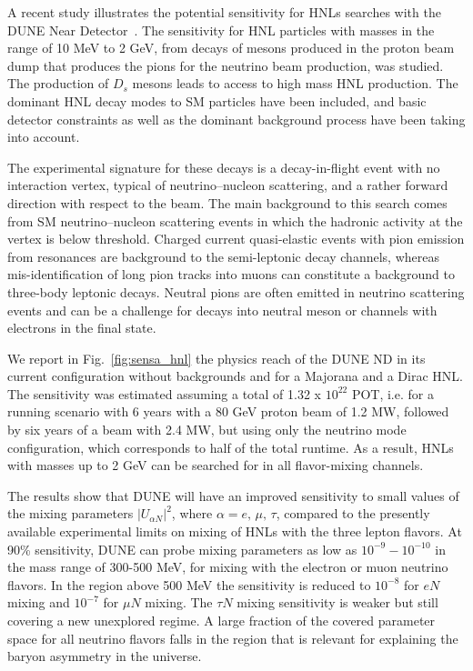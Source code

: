A recent study illustrates the potential sensitivity for  HNLs searches with the DUNE Near Detector~\cite{Ballett:2019bgd}. The sensitivity for HNL particles with masses in the range of 10 MeV to 2 GeV, from decays of mesons produced
in the proton beam dump that produces the pions for the neutrino beam production, was studied. The production
of $D_s$ mesons leads to access to high mass HNL production. The dominant HNL decay modes to SM particles
have been included, and basic detector constraints as well as the dominant background process have 
been taking into account. 

The experimental signature for these decays is a decay-in-flight event with no interaction vertex, typical of
neutrino--nucleon scattering, and a rather forward direction with respect to the beam.
The main background to this search comes from SM neutrino--nucleon scattering events in which the hadronic activity
at the vertex is below threshold.
Charged current quasi-elastic events with pion emission from resonances are background to the semi-leptonic decay channels,
whereas mis-identification of long pion tracks into muons can constitute a background to three-body leptonic decays.
Neutral pions are often emitted in neutrino scattering events and can be a challenge for decays into %
neutral meson or channels with electrons in the final state.

We report in Fig.~\ref{fig:sensa_hnl} the physics reach of the DUNE ND in its current configuration %
without backgrounds and for a Majorana and a Dirac HNL.
The sensitivity was estimated assuming a total of 1.32 x $10^{22}$ POT, i.e. for a running scenario with 6 years with a 80 GeV proton beam of 1.2 MW, followed by six years of a beam with 2.4 MW, but using only the neutrino mode configuration, which corresponds to half of the total
runtime.
As a result, HNLs with masses up to 2 GeV can be searched for in all flavor-mixing channels.



The results show that DUNE will have an improved sensitivity to small values of the
mixing parameters $|U_{\alpha N}|^2$, where $\alpha=e,\,\mu,\,\tau$, compared to the presently available experimental
limits on mixing of HNLs with the three lepton flavors. At 90\%  sensitivity, DUNE can probe mixing parameters as low as 
$10^{-9}-10^{-10}$ in the mass range of 300-500 MeV, for  mixing with the electron or muon neutrino flavors. In the region above 500 MeV the sensitivity
is reduced to $10^{-8}$ for $eN$ mixing and $10^{-7}$ for $\mu N$ mixing. The $\tau N$ mixing 
sensitivity is weaker but still covering a new unexplored regime. A large fraction of the covered parameter space for all neutrino flavors falls in the region that is relevant for explaining the baryon asymmetry in the universe.

